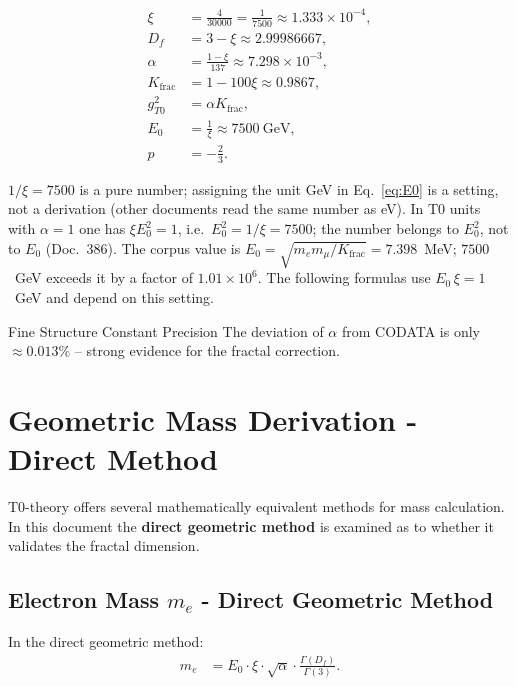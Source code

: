 	\begin{align}
		\xi &= \frac{4}{30000} = \frac{1}{7500} \approx 1.333 \times 10^{-4}, \label{eq:xi} \\
		D_f &= 3 - \xi \approx 2.99986667, \label{eq:Df} \\
		\alpha &= \frac{1 - \xi}{137} \approx 7.298 \times 10^{-3}, \label{eq:alpha} \\
		K_{\text{frac}} &= 1 - 100 \xi \approx 0.9867, \label{eq:K} \\
		g_{T0}^2 &= \alpha K_{\text{frac}}, \label{eq:gT0} \\
		E_0 &= \frac{1}{\xi} \approx \SI{7500}{\giga\electronvolt}, \label{eq:E0} \\
		p &= -\frac{2}{3}. \label{eq:p}
	\end{align}

	$1/\xi = 7500$ is a pure number; assigning the unit GeV in Eq.~\eqref{eq:E0} is a setting, not a derivation (other documents read the same number as eV). In T0 units with $\alpha = 1$ one has $\xi E_0^2 = 1$, i.e.\ $E_0^2 = 1/\xi = 7500$; the number belongs to $E_0^2$, not to $E_0$ (Doc.~386). The corpus value is $E_0 = \sqrt{m_e m_\mu/K_{\text{frac}}} = 7.398$~MeV; $7500$~GeV exceeds it by a factor of $1.01\times10^{6}$. The following formulas use $E_0\,\xi = 1$~GeV and depend on this setting.
	
	\begin{result}{Fine Structure Constant Precision}{}
		The deviation of $\alpha$ from CODATA is only $\approx 0.013\%$ -- strong evidence for the fractal correction.
	\end{result}
	
	\section{Geometric Mass Derivation - Direct Method}
	\label{sec:geometric_derivation}
	
	T0-theory offers several mathematically equivalent methods for mass calculation. In this document the \textbf{direct geometric method} is examined as to whether it validates the fractal dimension.
	
	\subsection{Electron Mass $m_e$ - Direct Geometric Method}
	\label{subsec:electron_mass}
	
	In the direct geometric method:
	\begin{align}
		m_e &= E_0 \cdot \xi \cdot \sqrt{\alpha} \cdot \frac{\Gamma(D_f)}{\Gamma(3)}. \label{eq:me_direct}
	\end{align}

